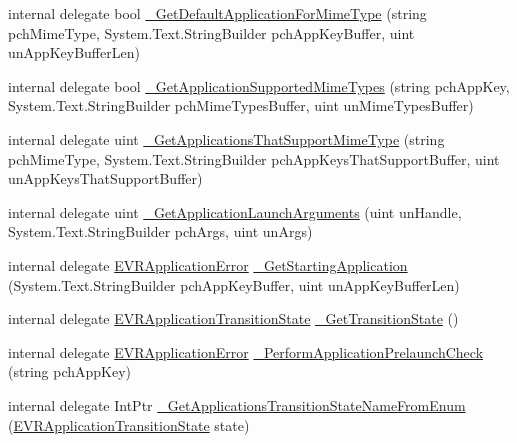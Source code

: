 \begin{DoxyCompactItemize}
\item 
internal delegate bool \mbox{\hyperlink{struct_valve_1_1_v_r_1_1_i_v_r_applications_ab4fbef52ef861cd328df9296e83073b5}{\+\_\+\+Get\+Default\+Application\+For\+Mime\+Type}} (string pch\+Mime\+Type, System.\+Text.\+String\+Builder pch\+App\+Key\+Buffer, uint un\+App\+Key\+Buffer\+Len)
\item 
internal delegate bool \mbox{\hyperlink{struct_valve_1_1_v_r_1_1_i_v_r_applications_a0c1a0f078e0bd30ada05dccc30aaa3b9}{\+\_\+\+Get\+Application\+Supported\+Mime\+Types}} (string pch\+App\+Key, System.\+Text.\+String\+Builder pch\+Mime\+Types\+Buffer, uint un\+Mime\+Types\+Buffer)
\item 
internal delegate uint \mbox{\hyperlink{struct_valve_1_1_v_r_1_1_i_v_r_applications_a69203996ca75bee54e6ff4b68d774618}{\+\_\+\+Get\+Applications\+That\+Support\+Mime\+Type}} (string pch\+Mime\+Type, System.\+Text.\+String\+Builder pch\+App\+Keys\+That\+Support\+Buffer, uint un\+App\+Keys\+That\+Support\+Buffer)
\item 
internal delegate uint \mbox{\hyperlink{struct_valve_1_1_v_r_1_1_i_v_r_applications_ad9370206e2fdcbc78913aa7e21ec53fa}{\+\_\+\+Get\+Application\+Launch\+Arguments}} (uint un\+Handle, System.\+Text.\+String\+Builder pch\+Args, uint un\+Args)
\item 
internal delegate \mbox{\hyperlink{namespace_valve_1_1_v_r_a3488adab8a219b579fcee50f4e63a8b6}{E\+V\+R\+Application\+Error}} \mbox{\hyperlink{struct_valve_1_1_v_r_1_1_i_v_r_applications_a1eb7aeb6422c2a09ecf379532597cb05}{\+\_\+\+Get\+Starting\+Application}} (System.\+Text.\+String\+Builder pch\+App\+Key\+Buffer, uint un\+App\+Key\+Buffer\+Len)
\item 
internal delegate \mbox{\hyperlink{namespace_valve_1_1_v_r_af00430caae64a19e9ad612ac01a208c0}{E\+V\+R\+Application\+Transition\+State}} \mbox{\hyperlink{struct_valve_1_1_v_r_1_1_i_v_r_applications_a047619f84dbe4e1fc9faadd800669ac3}{\+\_\+\+Get\+Transition\+State}} ()
\item 
internal delegate \mbox{\hyperlink{namespace_valve_1_1_v_r_a3488adab8a219b579fcee50f4e63a8b6}{E\+V\+R\+Application\+Error}} \mbox{\hyperlink{struct_valve_1_1_v_r_1_1_i_v_r_applications_af8f1a196897ce93933338eca85476b37}{\+\_\+\+Perform\+Application\+Prelaunch\+Check}} (string pch\+App\+Key)
\item 
internal delegate Int\+Ptr \mbox{\hyperlink{struct_valve_1_1_v_r_1_1_i_v_r_applications_a84090171964167a37149043d7834077b}{\+\_\+\+Get\+Applications\+Transition\+State\+Name\+From\+Enum}} (\mbox{\hyperlink{namespace_valve_1_1_v_r_af00430caae64a19e9ad612ac01a208c0}{E\+V\+R\+Application\+Transition\+State}} state)

\end{DoxyCompactItemize}
